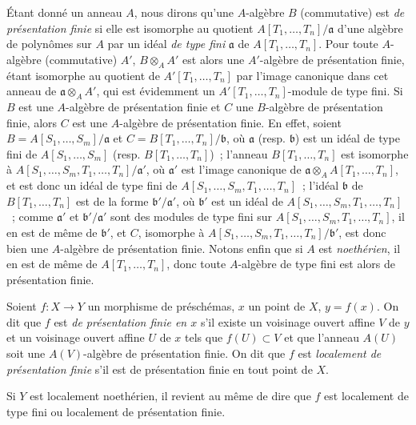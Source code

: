 \begin{env}[1.4.1]
\label{IV.1.4.1-fr}
Étant donné un anneau $A$, nous dirons qu'une $A$-algèbre $B$ (commutative)
est \emph{de présentation finie} si elle est isomorphe au quotient
$A[T_1,\ldots,T_n]/\mathfrak a$ d'une algèbre de polynômes sur $A$ par un
idéal \emph{de type fini} $\mathfrak a$ de $A[T_1,\ldots,T_n]$. Pour toute
$A$-algèbre (commutative) $A'$, $B\otimes_AA'$ est alors une $A'$-algèbre de
présentation finie, étant isomorphe au quotient de $A'[T_1,\ldots,T_n]$ par
l'image canonique dans cet anneau de $\mathfrak a\otimes_AA'$, qui est
évidemment un $A'[T_1,\ldots,T_n]$-module de type fini. Si $B$ est une
$A$-algèbre de présentation finie et $C$ une $B$-algèbre de présentation
finie, alors $C$ est une $A$-algèbre de présentation finie. En effet, soient
$B=A[S_1,\ldots,S_m]/\mathfrak a$ et
$C=B[T_1,\ldots,T_n]/\mathfrak b$, où $\mathfrak a$ (resp. $\mathfrak b$) est
un idéal de type fini de $A[S_1,\ldots,S_m]$ (resp.
$B[T_1,\ldots,T_n]$)~; l'anneau $B[T_1,\ldots,T_n]$ est isomorphe à
$A[S_1,\ldots,S_m,T_1,\ldots,T_n]/\mathfrak a'$, où $\mathfrak a'$ est
l'image canonique de
$\mathfrak a\otimes_AA[T_1,\ldots,T_n]$, et est donc un idéal de type fini de
$A[S_1,\ldots,S_m,T_1,\ldots,T_n]$~; l'idéal $\mathfrak b$ de
$B[T_1,\ldots,T_n]$ est de la forme $\mathfrak b'/\mathfrak a'$, où
$\mathfrak b'$ est un idéal de $A[S_1,\ldots,S_m,T_1,\ldots,T_n]$~; comme
$\mathfrak a'$ et $\mathfrak b'/\mathfrak a'$ sont des modules de type fini
sur $A[S_1,\ldots,S_m,T_1,\ldots,T_n]$, il en est de même de $\mathfrak b'$,
et $C$, isomorphe à
$A[S_1,\ldots,S_m,T_1,\ldots,T_n]/\mathfrak b'$, est donc bien une
$A$-algèbre de présentation finie. Notons enfin que si $A$ est
\emph{noethérien}, il en est de même de $A[T_1,\ldots,T_n]$, donc toute
$A$-algèbre de type fini est alors de présentation finie.
\end{env}

\begin{definition}[1.4.2]
\label{IV.1.4.2-fr}
Soient $f:X\to Y$ un morphisme de préschémas, $x$ un point de $X$, $y=f(x)$.
On dit que $f$ est \emph{de présentation finie en $x$} s'il existe un voisinage
ouvert affine $V$ de $y$ et un voisinage ouvert affine $U$ de $x$ tels que
$f(U)\subset V$ et que l'anneau $A(U)$ soit une $A(V)$-algèbre de présentation
finie. On dit que $f$ est \emph{localement de présentation finie} s'il est de
présentation finie en tout point de $X$.
\end{definition}

Si $Y$ est localement noethérien, il revient au même de dire que $f$ est
localement de type fini ou localement de présentation finie.

